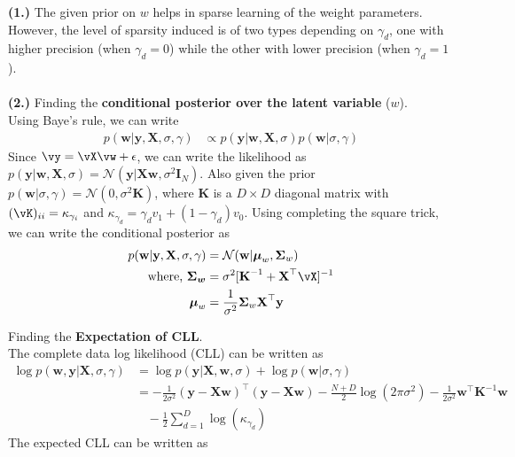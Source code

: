 \documentclass[a4paper,11pt]{article}
\begin{document}
\begin{pmisolution}

\noindent \textbf{(1.) } The given prior on $w$ helps in sparse learning of the weight parameters. However, the level of sparsity induced is of two types depending on $\gamma_d$, one with higher precision (when $\gamma_d = 0$) while the other with lower precision (when $\gamma_d = 1$).
\\ \\
\noindent \textbf{(2.) } Finding the \textbf{conditional posterior over the latent variable} ($w$).\\ Using Baye's rule, we can write
\begin{align}
    p(\textbf{w}|\textbf{y}, \textbf{X}, \sigma, \gamma) &\propto p(\textbf{y}|\textbf{w}, \textbf{X}, \sigma) p(\textbf{w}|\sigma, \gamma)
    \nonumber
\end{align}
Since $\vy = \vX\vw + \mathbf{\epsilon}$, we can write the likelihood as $p(\textbf{y}|\textbf{w}, \textbf{X}, \sigma) = \mathcal{N}(\textbf{y}|\textbf{Xw}, \sigma^2\textbf{I}_N)$. Also given the prior $p(\textbf{w}|\sigma, \gamma) = \mathcal{N}(0, \sigma^2\textbf{K})$, where $\textbf{K}$ is a $D \times D$ diagonal matrix with $(\vK)_{ii} = \kappa_{\gamma_i}$ and $\kappa_{\gamma_d} = \gamma_d v_1 + (1-\gamma_d) v_0$. Using completing the square trick, we can write the conditional posterior as
\begin{equation}
\begin{split}
    p(\textbf{w}|\textbf{y}, \textbf{X}, \sigma, \gamma) &= \mathcal{N}(\textbf{w}| \boldsymbol{\mu}_w, \boldsymbol{\Sigma}_w)
    \\ \text{where, } \boldsymbol{\Sigma_w} &= \sigma^2 [\textbf{K}^{-1} + \textbf{X}^\top\vX] ^{-1}
    \\ \boldsymbol{\mu}_w &= \frac{1}{\sigma^2} \boldsymbol{\Sigma}_w\textbf{X}^\top\textbf{y}
\end{split}
\end{equation}

\noindent Finding the \textbf{Expectation of CLL}.\\
The complete data log likelihood (CLL) can be written as
\begin{equation}
\label{eqn3_2}
\begin{split}
    \log p(\textbf{w}, \textbf{y}|\textbf{X}, \sigma, \gamma) &= \log p(\textbf{y}|\textbf{X}, \textbf{w}, \sigma) + \log p(\textbf{w}| \sigma, \gamma)
    \\ &= -\frac{1}{2\sigma^2}(\textbf{y} - \textbf{Xw})^\top(\textbf{y} - \textbf{Xw}) - \frac{N+D}{2} \log (2\pi\sigma^2) - \frac{1}{2\sigma^2}\textbf{w}^\top\textbf{K}^{-1}\textbf{w} \\& ~~~~ - \frac{1}{2} \sum_{d=1}^D \log (\kappa_{\gamma_d})    
\end{split}
\end{equation}
The expected CLL can be written as


\end{pmisolution}
\end{document}
